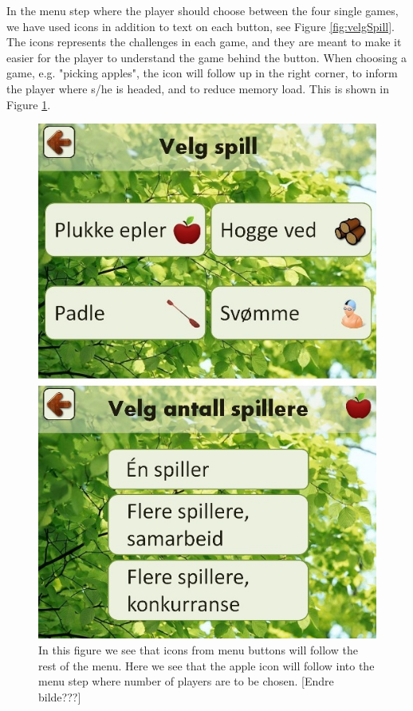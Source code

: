 In the menu step where the player should choose between the four single games, we have used icons in addition to text on each button, see Figure \ref{fig:velgSpill}. The icons represents the challenges in each game, and they are meant to make it easier for the player to understand the game behind the button. When choosing a game, e.g. "picking apples", the icon will follow up in the right corner, to inform the player where s/he is headed, and to reduce memory load. This is shown in Figure \ref{fig:iconEple}.  

\begin{figure} [ht!]
\centering
\includegraphics[scale=0.5]{IconEple.jpg}
\caption[Menu - Use of Icons]{In this figure we see that icons from menu buttons will follow the rest of the menu. Here we see that the apple icon will follow into the menu step where number of players are to be chosen. [Endre bilde???]}
\label{fig:iconEple}
\end{figure} 
      

